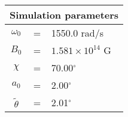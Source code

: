  \begin{tabular}{ccl}
\multicolumn{3}{c}{Simulation parameters} \\
\hline
$\omega_0$  &=& 1550.0 rad/s\\
$B_0$  &=& $ 1.581\times 10^{14} $ G \\
$\chi$  &=& 70.00$^{\circ}$ \\
$a_0$ &=& 2.00$^{\circ}$ \\
$\tilde{\theta}$ &= & 2.01$^{\circ}$
\end{tabular}
    